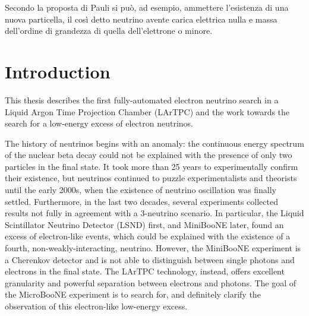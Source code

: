 \begin{savequote}[8cm]
 Secondo la proposta di Pauli si può, ad esempio, ammettere l'esistenza di una nuova particella, il così detto neutrino avente carica elettrica nulla e massa dell'ordine di grandezza di quella dell'elettrone o minore.
\end{savequote}

\chapter{\label{ch:1-intro}Introduction} 

This thesis describes the first fully-automated electron neutrino search in a Liquid Argon Time Projection Chamber (LArTPC) and the work towards the search for a low-energy excess of electron neutrinos.

The history of neutrinos begins with an anomaly: the continuous energy spectrum of the nuclear beta decay could not be explained with the presence of only two particles in the final state. It took more than 25 years to experimentally confirm their existence, but neutrinos continued to puzzle experimentalists and theorists until the early 2000s, when the existence of neutrino oscillation was finally settled. 
Furthermore, in the last two decades, several experiments collected results not fully in agreement with a 3-neutrino scenario.
In particular, the Liquid Scintillator Neutrino Detector (LSND) first, and MiniBooNE later, found an excess of electron-like events, which could be explained with the existence of a fourth, non-weakly-interacting, neutrino. However, the MiniBooNE experiment is a Cherenkov detector and is not able to distinguish between single photons and electrons in the final state. The LArTPC technology, instead, offers excellent granularity and powerful separation between electrons and photons. The goal of the MicroBooNE experiment is to search for, and definitely clarify the observation of this electron-like low-energy excess.

